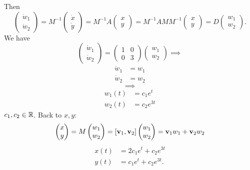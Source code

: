 \documentclass[10pt, a4paper]{article}
\begin{document}
\begin{example}
    Then
    \[
    \begin{pmatrix}
        \dot{w}_1 \\ \dot{w}_2
    \end{pmatrix}
    = M ^ {-1}
    \begin{pmatrix}
        \dot{x} \\ \dot{y}
    \end{pmatrix}
    = M ^ {-1}A\begin{pmatrix}
        x \\ y
    \end{pmatrix}
    = M ^ {-1}AMM ^ {-1}\begin{pmatrix}
        x \\ y
    \end{pmatrix} = D\begin{pmatrix}
        w_1 \\ w_2
    \end{pmatrix}.
    \]
    We have
    \[
    \begin{pmatrix}
        \dot{w}_1 \\ \dot{w}_2
    \end{pmatrix}
    =
    \begin{pmatrix}
        1 & 0 \\ 0 & 3
    \end{pmatrix}
    \begin{pmatrix}
        w_1 \\ w_2
    \end{pmatrix}
    \implies
    \]
    \begin{align*}
        \dot{w}_1 &= w_1 \\
        \dot{w}_2 &= w_2
    \end{align*}
    \[
    \implies
    \]
    \begin{align*}
        {w}_1(t) &= c_1e ^ t \\
        {w}_2(t) &= c_2e ^ {3t}
    \end{align*}
    $c_1, c_2 \in \mathbb{R}$.
    Back to $x, y$:
    \[
    \begin{pmatrix}
        x \\ y
    \end{pmatrix} = M\begin{pmatrix}
        w_1 \\ w_2
    \end{pmatrix}
    = [\mathbf{v}_1, \mathbf{v}_2]\begin{pmatrix}
        w_1 \\ w_2
    \end{pmatrix}
    = \mathbf{v}_1w_1 + \mathbf{v}_2w_2
    \]
    \begin{align*}
        x(t) &= 2c_1e ^ t + c_2e ^ {3t} \\
        y(t) &= c_1e ^ t + c_2e ^ {3t}.
    \end{align*}
\end{example}
\end{document}
